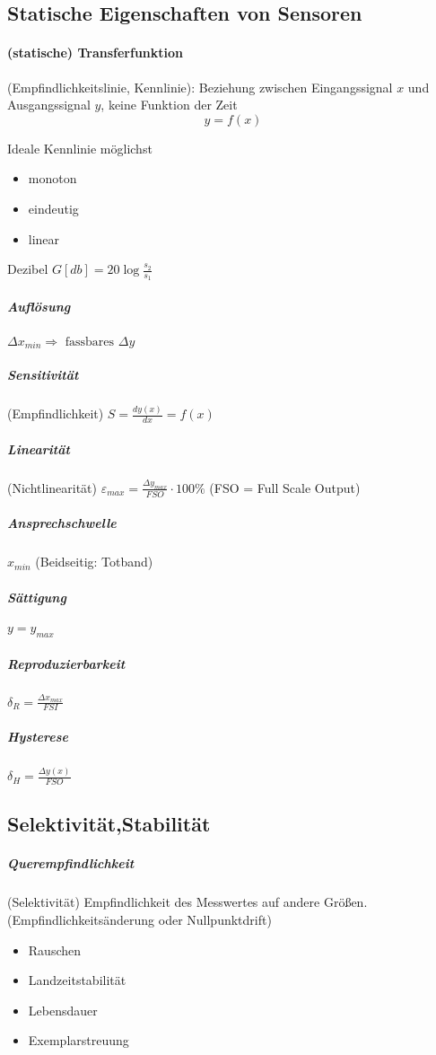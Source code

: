 \documentclass[a4paper]{scrartcl}
\begin{document}
\subsection{Statische Eigenschaften von Sensoren}
\paragraph{(statische) Transferfunktion} (Empfindlichkeitslinie, Kennlinie): Beziehung zwischen Eingangssignal $x$ und Ausgangssignal $y$, keine Funktion der Zeit
\[ y= f(x) \]

Ideale Kennlinie möglichst
\begin{itemize}
\item monoton
\item eindeutig
\item linear
\end{itemize}

Dezibel $G[db] = 20 \log{\frac{s_2}{s_1}}$

\subparagraph{Auflösung} $\Delta x_{min} \Rightarrow \text{ fassbares } \Delta y$

\subparagraph{Sensitivität} (Empfindlichkeit) $S= \frac{dy(x)}{dx} = f(x)$

\subparagraph{Linearität}(Nichtlinearität) $\varepsilon_{max} = \frac{\Delta y_{max}}{FSO} \cdot 100 \% $ (FSO = Full Scale Output)

\subparagraph{Ansprechschwelle} $x_{min}$ (Beidseitig: Totband)

\subparagraph{Sättigung} $y=y_{max}$

\subparagraph{Reproduzierbarkeit} $\delta_R = \frac{\Delta x_{max}}{FSI}$

\subparagraph{Hysterese} $\delta_H = \frac{\Delta y(x)}{FSO}$

\subsection{Selektivität,Stabilität}

\subparagraph{Querempfindlichkeit}(Selektivität) Empfindlichkeit des Messwertes auf andere Größen. (Empfindlichkeitsänderung oder Nullpunktdrift)

\begin{itemize}
\item Rauschen
\item Landzeitstabilität
\item Lebensdauer
\item Exemplarstreuung
\end{itemize}
\end{document}
